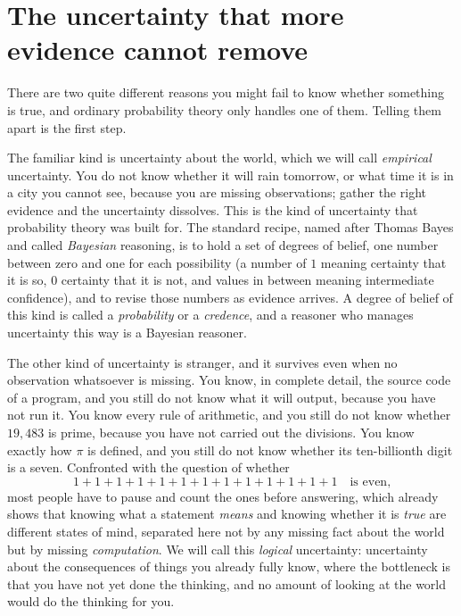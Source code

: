 \documentclass[10pt]{article}
\theoremstyle{definition}
\theoremstyle{remark}
\begin{document}
\section{The uncertainty that more evidence cannot remove}
\label{sec:intro}

There are two quite different reasons you might fail to know whether something is true, and ordinary probability theory only handles one of them. Telling them apart is the first step.

The familiar kind is uncertainty about the world, which we will call \emph{empirical} uncertainty. You do not know whether it will rain tomorrow, or what time it is in a city you cannot see, because you are missing observations; gather the right evidence and the uncertainty dissolves. This is the kind of uncertainty that probability theory was built for. The standard recipe, named after Thomas Bayes and called \emph{Bayesian} reasoning, is to hold a set of degrees of belief, one number between zero and one for each possibility (a number of $1$ meaning certainty that it is so, $0$ certainty that it is not, and values in between meaning intermediate confidence), and to revise those numbers as evidence arrives. A degree of belief of this kind is called a \emph{probability} or a \emph{credence}, and a reasoner who manages uncertainty this way is a Bayesian reasoner.

The other kind of uncertainty is stranger, and it survives even when no observation whatsoever is missing. You know, in complete detail, the source code of a program, and you still do not know what it will output, because you have not run it. You know every rule of arithmetic, and you still do not know whether $19{,}483$ is prime, because you have not carried out the divisions. You know exactly how $\pi$ is defined, and you still do not know whether its ten-billionth digit is a seven. Confronted with the question of whether
\[
1+1+1+1+1+1+1+1+1+1+1+1+1 \quad\text{is even,}
\]
most people have to pause and count the ones before answering, which already shows that knowing what a statement \emph{means} and knowing whether it is \emph{true} are different states of mind, separated here not by any missing fact about the world but by missing \emph{computation}. We will call this \emph{logical} uncertainty: uncertainty about the consequences of things you already fully know, where the bottleneck is that you have not yet done the thinking, and no amount of looking at the world would do the thinking for you.
\end{document}
